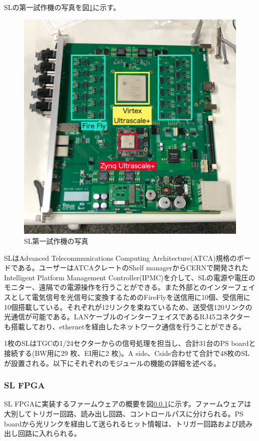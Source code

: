 SLの第一試作機の写真を図\ref{TGC_SL}に示す。

\begin{figure} 
\centering
\includegraphics[width=16cm]{fig/Intro/TGC_SL.jpg}
\caption[SL第一試作機の写真]{SL第一試作機の写真}
\label{TGC_SL}
\end{figure}

SLはAdvanced Telecommunications Computing Architecture(ATCA)規格のボードである。ユーザーはATCAクレートのShelf managerからCERNで開発されたIntelligent Platform Management Controller(IPMC)を介して、SLの電源や電圧のモニター、遠隔での電源操作を行うことができる。また外部とのインターフェイスとして電気信号を光信号に変換するためのFireFlyを送信用に10個、受信用に10個搭載している。それぞれが12リンクを束ねているため、送受信120リンクの光通信が可能である。LANケーブルのインターフェイスであるRJ45コネクターも搭載しており、ethernetを経由したネットワーク通信を行うことができる。

1枚のSLはTGCの1/24セクターからの信号処理を担当し、合計31台のPS boardと接続する(BW用に29 枚、EI用に2 枚)。A side、Cside合わせて合計で48枚のSLが設置される。以下にそれぞれのモジュールの機能の詳細を述べる。

    \subsubsection{SL FPGA}
SL FPGAに実装するファームウェアの概要を図\ref{}に示す。ファームウェアは大別してトリガー回路、読み出し回路、コントロールパスに分けられる。PS boardから光リンクを経由して送られるヒット情報は、トリガー回路および読み出し回路に入れられる。

